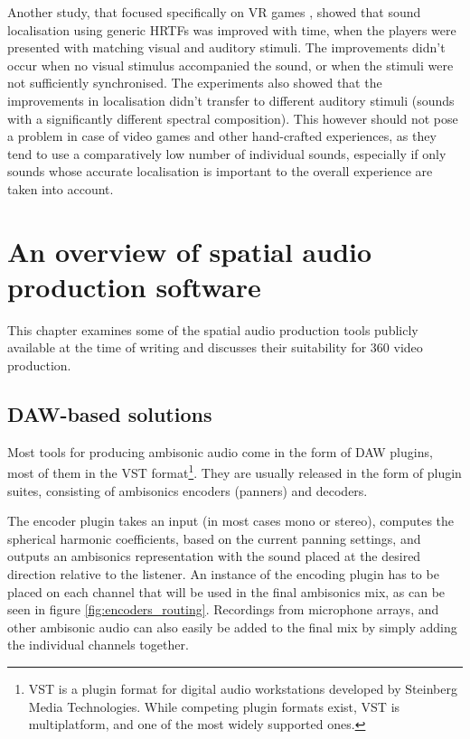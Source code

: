 Another study, that focused specifically on VR games \cite{generic_hrtfs_vr},
showed that sound localisation using generic HRTFs was improved with time, when the players were presented with 
matching visual and auditory stimuli. The improvements didn't occur when no visual stimulus accompanied the sound, 
or when the stimuli were not sufficiently synchronised. The experiments also showed that the improvements in 
localisation didn't transfer to different auditory stimuli (sounds with a significantly different spectral composition).
This however should not pose a problem in case of video games and other hand-crafted experiences,
as they tend to use a comparatively low number of individual sounds, especially 
if only sounds whose accurate localisation is important to the overall experience are taken into account.



\chapter{An overview of spatial audio production software}

\begin{chapterabstract}
    This chapter examines some of the spatial audio production tools
    publicly available at the time of writing and discusses their suitability
    for 360\degree{} video production.
\end{chapterabstract}

\section{DAW-based solutions}

Most tools for producing ambisonic audio come in the form of DAW plugins, most of them in the VST format\footnote{
    VST is a plugin format for digital audio workstations developed by Steinberg Media Technologies. \cite{vst_steinberg}
    While competing plugin formats exist, VST is multiplatform, and one of the most widely supported ones.
}.
They are usually released in the form of plugin suites, consisting of ambisonics encoders (panners) and decoders.

The encoder plugin takes an input (in most cases mono or stereo), computes the spherical harmonic coefficients, 
based on the current panning settings, and outputs an ambisonics representation with the sound placed at the desired direction relative to the listener.
An instance of the encoding plugin has to be placed on each channel that will be used in the final ambisonics mix, as can be seen in figure \ref{fig:encoders_routing}.
Recordings from microphone arrays, and other ambisonic audio can also easily be added to the final mix by simply adding the individual channels together.


